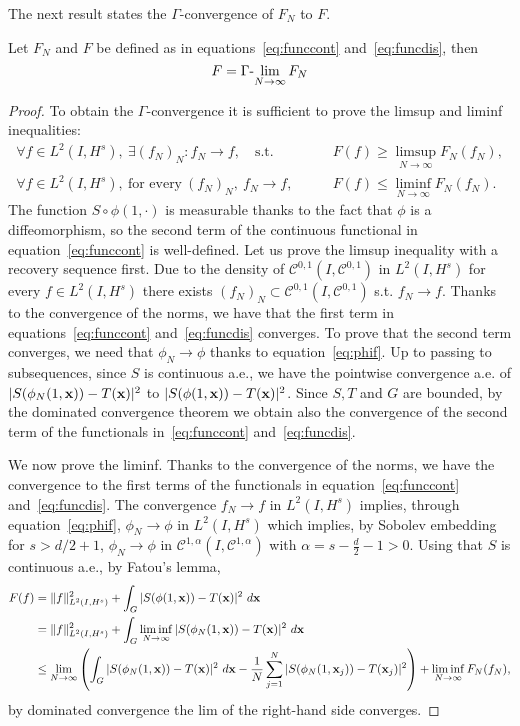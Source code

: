 The next result states the $\Gamma$-convergence of $F_N$ to $F$.
\begin{theorem} Let $F_N$ and $F$ be defined as in equations~\eqref{eq:funccont} and~\eqref{eq:funcdis}, then
 \begin{equation*}
  F = \Gamma{\text -}\!\lim_{N\to\infty} F_N
 \end{equation*}
\end{theorem}
\begin{proof}
  To obtain the $\Gamma$-convergence it is sufficient to prove the limsup and liminf inequalities:
  \begin{align*}
    \forall f\in L^2(I, H^s),\ \exists (f_N)_N: f_N\to f,\quad \text{s.t.}\quad &F(f)\geq \limsup_{N\to\infty}F_N(f_N),\\
    \forall f\in L^2(I, H^s),\ \text{for every}\ (f_N)_N,\ f_N\to f,\qquad &F(f)\leq\liminf_{N\to\infty} F_N(f_N).
  \end{align*}
  The function $S\circ\phi(1, \cdot)$ is measurable thanks to the fact that $\phi$ is a diffeomorphism, so the second term of the continuous functional in equation~\eqref{eq:funccont} is well-defined. Let us prove the limsup inequality with a recovery sequence first. Due to the density of $\mathcal{C}^{0, 1}(I, \mathcal{C}^{0, 1})$ in $L^2(I, H^s)$ for every $f\in L^2(I, H^s)$ there exists $(f_N)_N\subset\mathcal{C}^{0, 1}(I, \mathcal{C}^{0, 1})$ s.t. $f_N\to f$. Thanks to the convergence of the norms, we have that the first term in equations~\eqref{eq:funccont} and~\eqref{eq:funcdis} converges. To prove that the second term converges, we need that $\phi_N\rightarrow \phi$ thanks to equation~\eqref{eq:phif}. Up to passing to subsequences, since $S$ is continuous a.e., we have the pointwise convergence a.e. of $|S(\phi_N(1, \mathbf{x}))-T(\mathbf{x})|^2$ to $|S(\phi(1, \mathbf{x}))-T(\mathbf{x})|^2$. Since $S, T$ and $G$ are bounded, by the dominated convergence theorem we obtain also the convergence of the second term of the functionals in~\eqref{eq:funccont} and~\eqref{eq:funcdis}.
  
  We now prove the liminf. Thanks to the convergence of the norms, we have the convergence to the first terms of the functionals in equation~\eqref{eq:funccont} and~\eqref{eq:funcdis}. The convergence $f_N\to f$ in $L^2(I, H^s)$ implies, through equation~\eqref{eq:phif}, $\phi_N\to \phi$ in $L^2(I, H^s)$ which implies, by Sobolev embedding for $s>d/2 + 1$, $\phi_N\to \phi$ in $\mathcal{C}^{1, \alpha}(I, \mathcal{C}^{1, \alpha})$ with $\alpha=s - \tfrac{d}{2} - 1>0$. Using that $S$ is continuous a.e., by Fatou's lemma,
\begin{align*}
  F(f)&=\lVert f\rVert^2_{L^2(I, H^s)}+\int_G |S(\phi(1, \x))-T(\x)|^2\ d\x \\
  &= \lVert f\rVert^2_{L^2(I, H^s)}+\int_G \liminf_{N\to\infty}|S(\phi_N(1, \x))-T(\x)|^2\ d\x\\
   &\leq\lim_{N\to\infty}\left(\int_G |S(\phi_N(1, \x))-T(\x)|^2\ d\x-\frac{1}{N}\sum_{j=1}^{N} |S(\phi_N(1, \x_j))-T(\x_j)|^2\right) + \liminf_{N\to\infty} F_N(f_N),
\end{align*}
by dominated convergence the lim of the right-hand side converges.
\end{proof}
  
